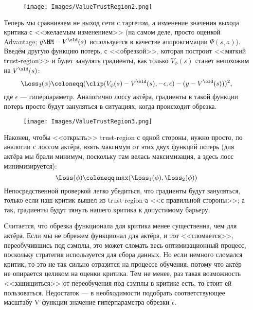 \begin{wrapfigure}{r}{0.4\textwidth}
\centering
\texttt{[image: Images/ValueTrustRegion2.png]}
\end{wrapfigure}
Теперь мы сравниваем не выход сети с таргетом, а изменение значения выхода критика с <<желаемым изменением>> (на самом деле, просто оценкой Advantage; $y \HM- V^{\old}(s)$ используется в качестве аппроксимации $\Psi(s, a)$). Введём другую функцию потерь, с <<обрезкой>>, которая построит <<мягкий trust-region>> и будет занулять градиенты, как только $V_{\phi}(s)$ станет непохожим на $V^{\old}(s)$:
$$\Loss_2(\phi) \coloneqq (\clip(V_{\phi}(s) - V^{\old}(s), -\epsilon, \epsilon) - (y - V^{\old}(s)))^2,$$
где $\epsilon$ --- гиперпараметр. Аналогично лоссу актёра, градиенты в такой функции потерь просто будут зануляться в ситуациях, когда происходит обрезка.

\begin{wrapfigure}{r}{0.4\textwidth}
\vspace{-0.7cm}
\centering
\texttt{[image: Images/ValueTrustRegion3.png]}
\end{wrapfigure}
Наконец, чтобы <<открыть>> trust-region с одной стороны, нужно просто, по аналогии с лоссом актёра, взять максимум от этих двух функций потерь (для актёра мы брали минимум, поскольку там велась максимизация, а здесь лосс минимизируется):
$$\Loss(\phi) \coloneqq \max(\Loss_1(\phi), \Loss_2(\phi))$$
Непосредственной проверкой легко убедиться, что градиенты будут зануляться, только если наш критик вышел из trust-region-а <<с правильной стороны>>; а так, градиенты будут тянуть нашего критика к допустимому барьеру.

\begin{remark}
Считается, что обрезка функционала для критика менее существенна, чем для актёра. Если мы не обрежем функционал для актёра, и тот <<сломается>>, переобучившись под сэмплы, это может сломать весь оптимизационный процесс, поскольку стратегия используется для сбора данных. Но если немного сломался критик, то это не так сильно отразится на процессе обучения, потому что актёр не опирается целиком на оценки критика. Тем не менее, раз такая возможность <<защищиться>> от переобучения под сэмплы в критике есть, то стоит ей пользоваться. Недостаток --- в необходимости подобрать соответствующее масштабу V-функции значение гиперпараметра обрезки $\epsilon$.
\end{remark}

